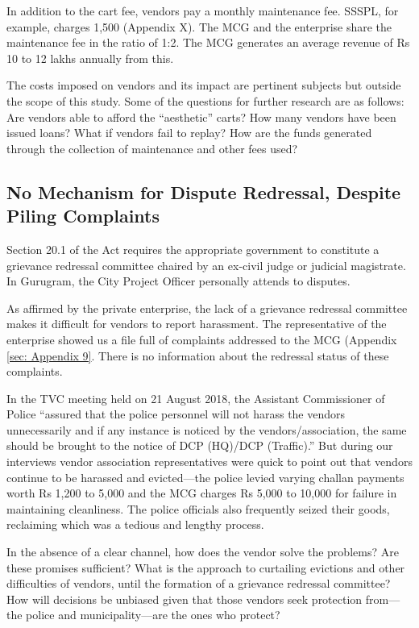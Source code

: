 \documentclass[a4paper, 12pt, twoside]{article}
\begin{document}
{{In addition to the cart fee, vendors pay a monthly maintenance fee. SSSPL, for example, charges 1,500 (Appendix X). The MCG and the enterprise share the maintenance fee in the ratio of 1:2. The MCG generates an average revenue of Rs 10 to 12 lakhs annually from this.

The costs imposed on vendors and its impact are pertinent subjects but outside the scope of this study. Some of the questions for further research are as follows: Are vendors able to afford the “aesthetic” carts? How many vendors have been issued loans? What if vendors fail to replay? How are the funds generated through the collection of maintenance and other fees used?

\subsection*{No Mechanism for Dispute Redressal, Despite Piling Complaints}

Section 20.1 of the Act requires the appropriate government to constitute a grievance redressal committee chaired by an ex-civil judge or judicial magistrate. In Gurugram, the City Project Officer personally attends to disputes.

As affirmed by the private enterprise, the lack of a grievance redressal committee makes it difficult for vendors to report harassment. The representative of the enterprise showed us a file full of complaints addressed to the MCG (Appendix \ref{sec: Appendix 9}. There is no information about the redressal status of these complaints.

In the TVC meeting held on 21 August 2018, the Assistant Commissioner of Police “assured that the police personnel will not harass the vendors unnecessarily and if any instance is noticed by the vendors/association, the same should be brought to the notice of DCP (HQ)/DCP (Traffic).” But during our interviews vendor association representatives were quick to point out that  vendors continue to be harassed and evicted—the police levied varying challan payments worth Rs 1,200 to 5,000 and the MCG charges Rs 5,000 to 10,000 for failure in maintaining cleanliness. The police officials also frequently seized their goods, reclaiming which was a tedious and lengthy process.

In the absence of a clear channel, how does the vendor solve the problems? Are these promises sufficient? What is the approach to curtailing evictions and other difficulties of vendors, until the formation of a grievance redressal committee? How will decisions be unbiased given that those vendors seek protection from—the police and municipality—are the ones who protect?

}}
\end{document}
